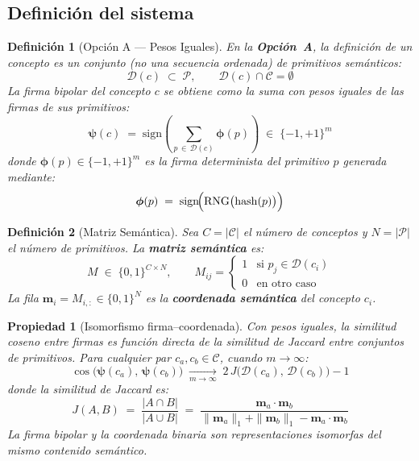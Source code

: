 \documentclass[12pt]{article}
\newtheorem{definition}{Definición}[section]
\newtheorem{property}{Propiedad}[section]
\begin{document}
\subsection{Definición del sistema}



\begin{definition}[Opción A — Pesos Iguales]
	En la \textbf{Opción~A}, la definición de un concepto es un conjunto (no una
	secuencia ordenada) de primitivos semánticos:
	\[
	\mathcal{D}(c) \;\subset\; \mathcal{P}, \qquad
	\mathcal{D}(c) \cap \mathcal{C} = \emptyset
	\]
	La firma bipolar del concepto $c$ se obtiene como la suma con pesos iguales de
	las firmas de sus primitivos:
	\[
	\bm{\psi}(c) \;=\; \mathrm{sign}\!\left(
	\sum_{p \,\in\, \mathcal{D}(c)} \bm{\phi}(p)
	\right) \;\in\; \{-1,+1\}^m
	\]
	donde $\bm{\phi}(p) \in \{-1,+1\}^m$ es la firma determinista del primitivo $p$
	generada mediante:
	\[
	\bm{\phi}(p) \;=\; \mathrm{sign}\!\Bigl(\mathrm{RNG}\bigl(\mathrm{hash}(p)\bigr)\Bigr)
	\]
\end{definition}

\begin{definition}[Matriz Semántica]
	Sea $C = |\mathcal{C}|$ el número de conceptos y $N = |\mathcal{P}|$ el número
	de primitivos. La \textbf{matriz semántica} es:
	\[
	M \;\in\; \{0,1\}^{C \times N}, \qquad
	M_{ij} =
	\begin{cases}
		1 & \text{si } p_j \in \mathcal{D}(c_i) \\
		0 & \text{en otro caso}
	\end{cases}
	\]
	La fila $\mathbf{m}_i = M_{i,:} \in \{0,1\}^N$ es la \textbf{coordenada semántica}
	del concepto $c_i$.
\end{definition}

\begin{property}[Isomorfismo firma–coordenada]
	Con pesos iguales, la similitud coseno entre firmas es función directa de la
	similitud de Jaccard entre conjuntos de primitivos. Para cualquier par
	$c_a, c_b \in \mathcal{C}$, cuando $m \to \infty$:
	\[
	\cos\!\bigl(\bm{\psi}(c_a),\,\bm{\psi}(c_b)\bigr)
	\;\xrightarrow[m\to\infty]{}\;
	2\,J\!\bigl(\mathcal{D}(c_a),\,\mathcal{D}(c_b)\bigr) - 1
	\]
	donde la similitud de Jaccard es:
	\[
	J(A,B) \;=\; \frac{|A \cap B|}{|A \cup B|}
	\;=\; \frac{\mathbf{m}_a \cdot \mathbf{m}_b}
	{\|\mathbf{m}_a\|_1 + \|\mathbf{m}_b\|_1
		- \mathbf{m}_a \cdot \mathbf{m}_b}
	\]
	La firma bipolar y la coordenada binaria son representaciones isomorfas del
	mismo contenido semántico.
\end{property}
\end{document}
